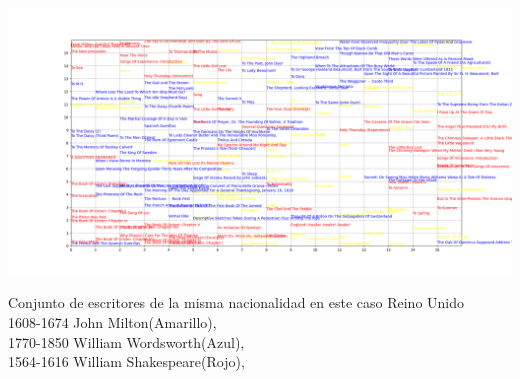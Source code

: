 \documentclass[a4paper, 11pt, oneside]{article}
\begin{document}
\begin{center}
    \includegraphics[scale=0.15]{Imagenes/1.png}
\end{center}
Conjunto de escritores de la misma nacionalidad en este caso Reino Unido\\
1608-1674 John Milton(Amarillo),\\
1770-1850 William Wordsworth(Azul),\\
1564-1616 William Shakespeare(Rojo),
\end{document}
